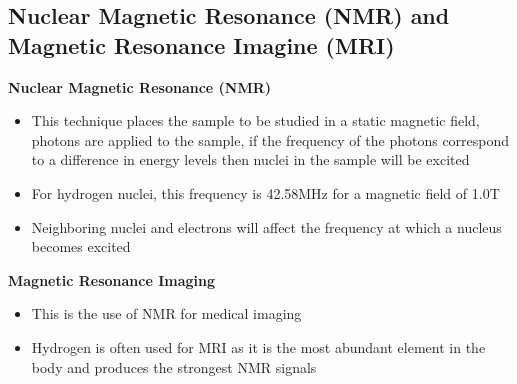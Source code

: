 \subsection{Nuclear Magnetic Resonance (NMR) and Magnetic Resonance Imagine (MRI)}
\textbf{Nuclear Magnetic Resonance (NMR)}
\begin{itemize}
    \item This technique places the sample to be studied in a static magnetic field, photons are applied to the sample, if the frequency of the photons correspond to a difference in energy levels then nuclei in the sample will be excited
    \item For hydrogen nuclei, this frequency is 42.58MHz for a magnetic field of 1.0T
    \item Neighboring nuclei and electrons will affect the frequency at which a nucleus becomes excited
\end{itemize}

\textbf{Magnetic Resonance Imaging}
\begin{itemize}
    \item This is the use of NMR for medical imaging
    \item Hydrogen is often used for MRI as it is the most abundant element in the body and produces the strongest NMR signals
\end{itemize}

\newpage